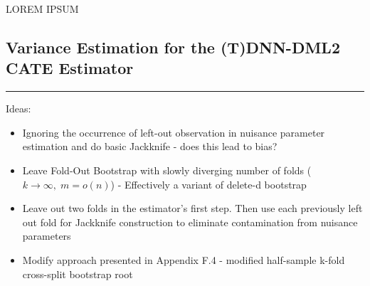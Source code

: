 {\color{red} LOREM IPSUM}

\subsection{Variance Estimation for the (T)DNN-DML2 CATE Estimator}\label{CATE_Var_Ests}
\hrule

{\color{red}
Ideas:
\begin{itemize}
	\item Ignoring the occurrence of left-out observation in nuisance parameter estimation and do basic Jackknife - does this lead to bias?
	\item Leave Fold-Out Bootstrap with slowly diverging number of folds ($k \rightarrow \infty, \;m = o(n)$) - Effectively a variant of delete-d bootstrap
	\item Leave out two folds in the estimator's first step. 
	Then use each previously left out fold for Jackknife construction to eliminate contamination from nuisance parameters
	\item Modify approach presented in \citet{ritzwoller_simultaneous_2024} Appendix F.4 - modified half-sample k-fold cross-split bootstrap root
\end{itemize}
}

